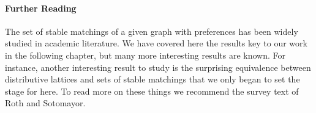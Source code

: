 \paragraph{Further Reading}
The set of stable matchings of a given graph with preferences has been widely studied in academic literature. We have covered here the results key to our work in the following chapter, but many more interesting results are known. For instance, another interesting result to study is the surprising equivalence between distributive lattices and sets of stable matchings that we only began to set the stage for here. To read more on these things we recommend the survey text of Roth and Sotomayor\cite{roth1992two}.